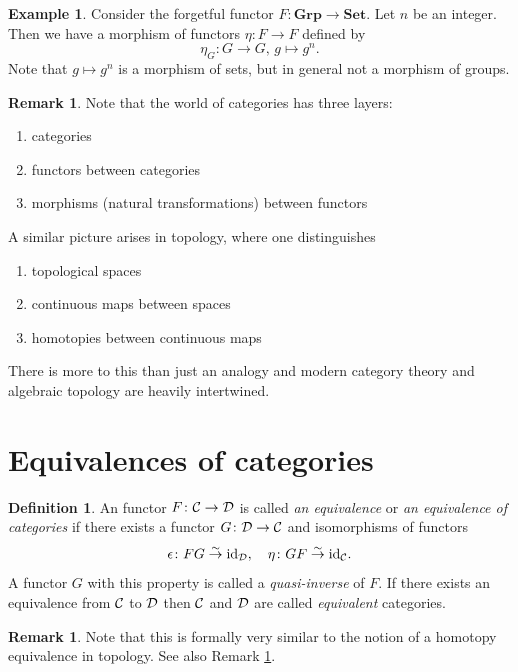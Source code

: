 \documentclass[11pt]{amsbook}
\newcommand{\isomto}{\overset{\sim}{\to}}
\def\id{{\rm id}}
\def\Set{\mathbf{Set}}
\def\Grp{\mathbf{Grp}}
\theoremstyle{plain}
\theoremstyle{definition}
\newtheorem{definition}[theorem]{Definition}
\newtheorem{example}[theorem]{Example}
\newtheorem{remark}[theorem]{Remark}
\begin{document}
\begin{example}
Consider the forgetful functor $F\colon \Grp \to \Set$. Let $n$ be an integer. Then we have a morphism of functors $\eta\colon F \to F$ defined by
\[
	\eta_G \colon G \to G,\,g \mapsto g^n.
\]
Note that $g\mapsto g^n$ is a morphism of sets, but in general not a morphism of groups.
\end{example}

\begin{remark}\label{rmk:2-cat}
Note that the world of categories has three layers:
\begin{enumerate}
\item[(0)] categories
\item[(1)] functors between categories
\item[(2)] morphisms (natural transformations) between functors
\end{enumerate}
A similar picture arises in topology, where one distinguishes
\begin{enumerate}
\item[(0)] topological spaces
\item[(1)] continuous maps between spaces
\item[(2)] homotopies between continuous maps
\end{enumerate}
There is more to this than just an analogy and modern category theory and algebraic topology are heavily intertwined.

\end{remark}


\section{Equivalences of categories}




\begin{definition}
An functor $F\colon {\mathcal{C}} \to {\mathcal{D}}$ is called \emph{an equivalence} or \emph{an equivalence of categories} if there exists a functor $G\colon {\mathcal{D}} \to {\mathcal{C}}$ and isomorphisms of functors
\[
	\epsilon\colon FG \isomto \id_\cD,\quad \eta\colon GF\isomto \id_\cC.
\]
A functor $G$ with this property is called a \emph{quasi-inverse} of $F$. If there exists an equivalence from ${\mathcal{C}}$ to ${\mathcal{D}}$ then ${\mathcal{C}}$ and ${\mathcal{D}}$ are called \emph{equivalent} categories.
\end{definition}

\begin{remark}
Note that this is formally very similar to the notion of a homotopy equivalence in topology. See also Remark \ref{rmk:2-cat}.
\end{remark}
\end{document}
